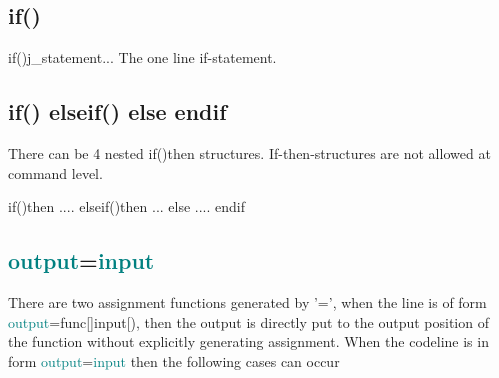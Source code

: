 \subsection{\textcolor{VioletRed}{if}()}
\label{if}

\textcolor{VioletRed}{if}()j\_statement... \newline
The one line if-statement.
\subsection{ \textcolor{VioletRed}{if}() elseif() else endif}
\label{ifthen}
There can be 4 nested \textcolor{VioletRed}{if}()then structures. If-then-structures are not
allowed at command level.

\textcolor{VioletRed}{if}()then
....
elseif()then
...
else
....
endif
\subsection{ \textcolor{teal}{output}=\textcolor{teal}{input}}
\label{ASSIGN}
There are two assignment functions generated by '=', when the line is of
form \textcolor{teal}{output}=func[]input[), then the output is directly
put to the output position of the function
without explicitly generating assignment.
When the codeline is in form \textcolor{teal}{output}=\textcolor{teal}{input} then the following cases can occur

